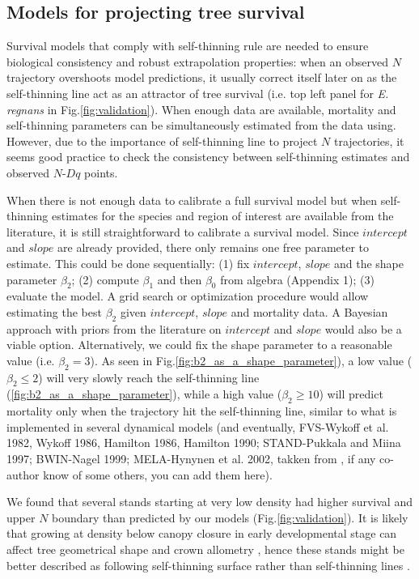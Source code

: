 \documentclass[12pt,english]{article}
\begin{document}
\subsection{Models for projecting tree survival}
Survival models that comply with self-thinning rule are needed to ensure biological consistency and robust extrapolation properties: when an observed $N$ trajectory overshoots model predictions, it usually correct itself later on as the self-thinning line act as an attractor of tree survival (i.e. top left panel for \textit{E. regnans} in Fig.\ref{fig:validation}). When enough data are available, mortality and self-thinning parameters can be simultaneously estimated from the data using. However, due to the importance of self-thinning line to project $N$ trajectories, it seems good practice to check the consistency between self-thinning estimates and observed $N$-$Dq$ points.

When there is not enough data to calibrate a full survival model but when self-thinning estimates for the species and region of interest are available from the literature, it is still straightforward to calibrate a survival model. Since $intercept$ and $slope$ are already provided, there only remains one free parameter to estimate. This could be done sequentially: (1) fix $intercept$, $slope$ and the shape parameter $\beta_2$; (2) compute $\beta_1$ and then $\beta_0$ from algebra (Appendix 1); (3) evaluate the model. A grid search or optimization procedure would allow estimating the best $\beta_2$ given $intercept$, $slope$ and mortality data. A Bayesian approach with priors from the literature on $intercept$ and $slope$ would also be a viable option. Alternatively, we could fix the shape parameter to a reasonable value (i.e. $\beta_2=3$). As seen in Fig.\ref{fig:b2_as_a_shape_parameter}), a low value ($\beta_2 \le 2$) will very slowly reach the self-thinning line (\ref{fig:b2_as_a_shape_parameter}), while a high value ($\beta_2 \ge 10$) will predict mortality only when the trajectory hit the self-thinning line, similar to what is implemented in several dynamical models \citet{LeMoguedecDhote2012} (and eventually, FVS-Wykoff et al. 1982, Wykoff 1986, Hamilton 1986, Hamilton 1990; STAND-Pukkala and Miina 1997; BWIN-Nagel 1999; MELA-Hynynen et al. 2002, takken from \citep{MonserudLedermannSterba2004}, if any co-author know of some others, you can add them here).

We found that several stands starting at very low density had higher survival and upper $N$ boundary than predicted by our models (Fig.\ref{fig:validation}). It is likely that growing at density below canopy closure in early developmental stage can affect tree geometrical shape and crown allometry \citep{PretzschBiber2005}, hence these stands might be better described as following self-thinning surface rather than self-thinning lines \citep{Bi2001, Garcia2012}.
\end{document}
